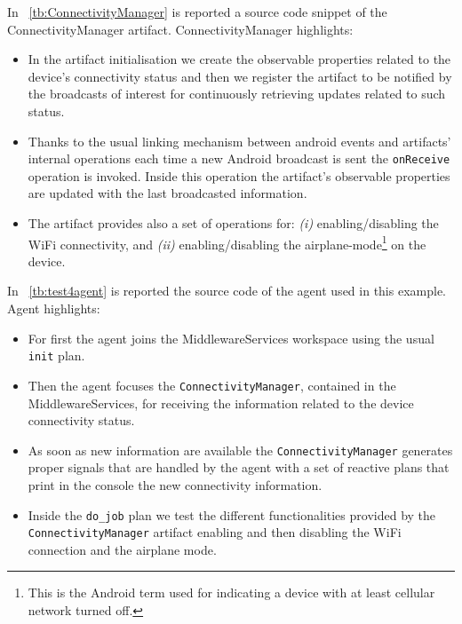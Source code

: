 \documentclass[11pt]{report}
\newcommand\xt[1]{\tablename~\ref{tb:#1}}
\newcommand\code[1]{{\mbox{\texttt{{#1}}}}}
\begin{document}
In \xt{ConnectivityManager} is reported a source code snippet of the \textsf{ConnectivityManager} artifact.
%
\textsf{ConnectivityManager} highlights:

\begin{itemize}
%
\item In the artifact initialisation we create the observable properties related to the device's connectivity status and then we register the artifact to be notified by the broadcasts of interest for continuously retrieving updates related to such status.
%
\item Thanks to the usual linking mechanism between android events and artifacts' internal operations each time a new Android broadcast is sent the \code{onReceive} operation is invoked. Inside this operation the artifact's observable properties are updated with the last broadcasted information.
%
\item The artifact provides also a set of operations for: \textit{(i)} enabling/disabling the WiFi connectivity, and\textit{ (ii)} enabling/disabling the airplane-mode\footnote{This is the Android term used for indicating a device with at least cellular network turned off.} on the device.

\end{itemize}

In \xt{test4agent} is reported the source code of the agent used in this example.
%
Agent highlights:

\begin{itemize}
%
\item For first the agent joins the \textsf{MiddlewareServices} workspace using the usual \code{init} plan.
%
\item Then the agent focuses the \code{ConnectivityManager}, contained in the \textsf{MiddlewareServices}, for receiving the information related to the device connectivity status.
%
\item As soon as new information are available the \code{ConnectivityManager} generates proper signals that are handled by the agent with a set of reactive plans that print in the console the new connectivity information.
%
\item Inside the \code{do\_job} plan we test the different functionalities provided by the \code{ConnectivityManager} artifact enabling and then disabling the WiFi connection and the airplane mode.
\end{itemize}
\end{document}
